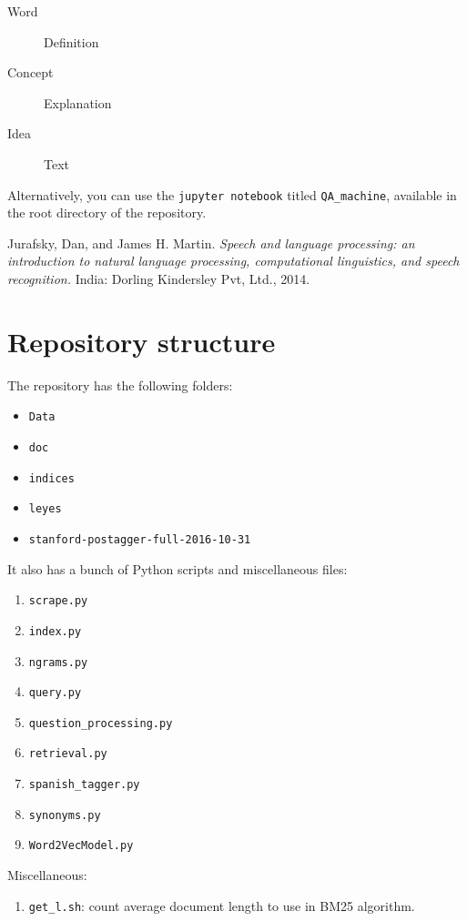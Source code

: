\documentclass[letterpaper]{article}
\begin{document}
\begin{description}
\item[Word] Definition
\item[Concept] Explanation
\item[Idea] Text
\end{description}

Alternatively, you can use the \texttt{jupyter notebook} titled \texttt{QA{\_}machine}, available in the root directory of the repository.

\begin{thebibliography}{9}
  Jurafsky, Dan, and James H. Martin. 
  \emph{Speech and language processing: an introduction to natural language processing, computational linguistics, and speech recognition.} 
  India: Dorling Kindersley Pvt, Ltd., 2014.

\end{thebibliography}

\appendix

\section{Repository structure}
The repository has the following folders:
\begin{itemize}
\item \texttt{Data}
\item \texttt{doc}
\item \texttt{indices}
\item \texttt{leyes}
\item \texttt{stanford-postagger-full-2016-10-31}
\end{itemize}

It also has a bunch of Python scripts and miscellaneous files:

\begin{enumerate}
\item \texttt{scrape.py}
\item \texttt{index.py}
\item \texttt{ngrams.py}
\item \texttt{query.py}
\item \texttt{question{\_}processing.py}
\item \texttt{retrieval.py}
\item \texttt{spanish{\_}tagger.py}
\item \texttt{synonyms.py}
\item \texttt{Word2VecModel.py}
\end{enumerate}

Miscellaneous:
\begin{enumerate}
\item \texttt{get{\_}l.sh}: count average document length to use in BM25 algorithm.
\end{enumerate}
\end{document}
